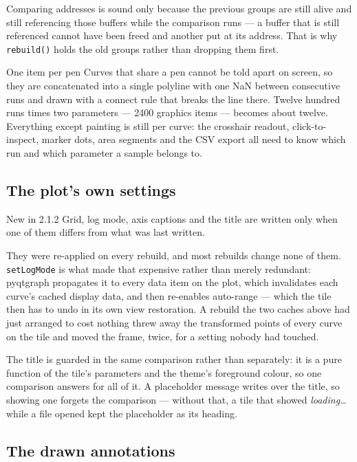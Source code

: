 \documentclass[11pt,a4paper,oneside]{report}
\newcommand{\appver}{2.1.2}
\newcommand{\code}[1]{\texttt{#1}}
\begin{document}
Comparing addresses is sound only because the previous groups are still alive
and still referencing those buffers while the comparison runs --- a buffer that
is still referenced cannot have been freed and another put at its address. That
is why \code{rebuild()} holds the old groups rather than dropping them first.

\begin{aoenote}{One item per pen}
Curves that share a pen cannot be told apart on screen, so they are concatenated
into a single polyline with one NaN between consecutive runs and drawn with a
connect rule that breaks the line there. Twelve hundred runs times two
parameters --- 2400 graphics items --- becomes about twelve. Everything except
painting is still per curve: the crosshair readout, click-to-inspect, marker
dots, area segments and the CSV export all need to know which run and which
parameter a sample belongs to.
\end{aoenote}

\subsection{The plot's own settings}

\begin{aoenew}{New in \appver}
Grid, log mode, axis captions and the title are written only when one of them
differs from what was last written.
\end{aoenew}

They were re-applied on every rebuild, and most rebuilds change none of them.
\code{setLogMode} is what made that expensive rather than merely redundant:
pyqtgraph propagates it to every data item on the plot, which invalidates each
curve's cached display data, and then re-enables auto-range --- which the tile
then has to undo in its own view restoration. A rebuild the two caches above had
just arranged to cost nothing threw away the transformed points of every curve
on the tile and moved the frame, twice, for a setting nobody had touched.

The title is guarded in the same comparison rather than separately: it is a pure
function of the tile's parameters and the theme's foreground colour, so one
comparison answers for all of it. A placeholder message writes over the title,
so showing one forgets the comparison --- without that, a tile that showed
\emph{loading\ldots} while a file opened kept the placeholder as its heading.

\subsection{The drawn annotations}
\end{document}
